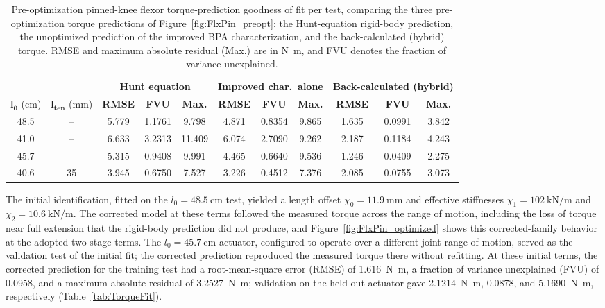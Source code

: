 \begin{table}[H]
\caption{Pre-optimization pinned-knee flexor torque-prediction goodness of fit per test, comparing the three pre-optimization torque predictions of Figure~\ref{fig:FlxPin_preopt}: the Hunt-equation rigid-body prediction, the unoptimized prediction of the improved BPA characterization, and the back-calculated (hybrid) torque. RMSE and maximum absolute residual (Max.) are in \unit{\newton\meter}, and FVU denotes the fraction of variance unexplained.}
\label{tab:FlxPinPreGof}
\begingroup
\renewcommand{\arraystretch}{1}%
\fontsize{10pt}{12pt}\selectfont
\begin{tabular}{@{}cc ccccccccc@{}}
\toprule
& & \multicolumn{3}{c}{\textbf{Hunt equation}} & \multicolumn{3}{c}{\textbf{Improved char.\ alone}} & \multicolumn{3}{c}{\textbf{Back-calculated (hybrid)}} \\
\cmidrule(lr){3-5} \cmidrule(lr){6-8} \cmidrule(l){9-11}
$\boldsymbol{l_{0}}$ (\unit{\cm}) & $\boldsymbol{l_{\text{ten}}}$ (\unit{\mm}) & \textbf{RMSE} & \textbf{FVU} & \textbf{Max.} & \textbf{RMSE} & \textbf{FVU} & \textbf{Max.} & \textbf{RMSE} & \textbf{FVU} & \textbf{Max.} \\
\midrule
48.5 & -- & 5.779 & 1.1761 & 9.798 & 4.871 & 0.8354 & 9.865 & 1.635 & 0.0991 & 3.842 \\
41.0 & -- & 6.633 & 3.2313 & 11.409 & 6.074 & 2.7090 & 9.262 & 2.187 & 0.1184 & 4.243 \\
45.7 & -- & 5.315 & 0.9408 & 9.991 & 4.465 & 0.6640 & 9.536 & 1.246 & 0.0409 & 2.275 \\
40.6 & 35 & 3.945 & 0.6750 & 7.527 & 3.226 & 0.4512 & 7.376 & 2.085 & 0.0755 & 3.073 \\
\bottomrule
\end{tabular}
\endgroup
\end{table}



The initial identification, fitted on the $l_{0}=\qty{48.5}{\cm}$ test, yielded a length offset $\chi_{0} = \qty{11.9}{\mm}$ and effective stiffnesses $\chi_{1} = \qty{102}{\kN\per\m}$ and $\chi_{2} = \qty{10.6}{\kN\per\m}$. The corrected model at these terms followed the measured torque across the range of motion, including the loss of torque near full extension that the rigid-body prediction did not produce, and Figure~\ref{fig:FlxPin_optimized} shows this corrected-family behavior at the adopted two-stage terms. The $l_{0}=\qty{45.7}{\cm}$ actuator, configured to operate over a different joint range of motion, served as the validation test of the initial fit; the corrected prediction reproduced the measured torque there without refitting. At these initial terms, the corrected prediction for the training test had a root-mean-square error (RMSE) of \qty{1.616}{\newton\meter}, a fraction of variance unexplained (FVU) of 0.0958, and a maximum absolute residual of \qty{3.2527}{\newton\meter}; validation on the held-out actuator gave \qty{2.1214}{\newton\meter}, 0.0878, and \qty{5.1690}{\newton\meter}, respectively (Table~\ref{tab:TorqueFit}).


